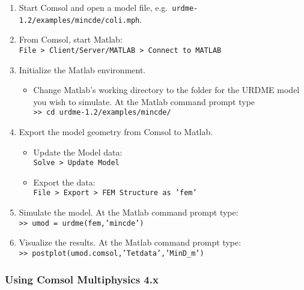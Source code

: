 \begin{enumerate}
\item Start Comsol and open a model file,
  e.g.~\texttt{urdme-1.2/examples/mincde/coli.mph}.
\item From Comsol, start Matlab: \\ \texttt{File >
  Client/Server/MATLAB > Connect to MATLAB}
\item Initialize the Matlab environment.
  \begin{itemize}
  \item Change Matlab's working directory to the folder for the URDME
    model you wish to simulate. At the Matlab command prompt type \\
    \texttt{>> cd urdme-1.2/examples/mincde/}
  \end{itemize}
\item Export the model geometry from Comsol to Matlab.
  \begin{itemize}
  \item Update the Model data:\\ \texttt{Solve >
    Update Model}
  \item Export the data:\\ \texttt{File > Export >
    FEM Structure as 'fem'}
  \end{itemize}
\item Simulate the model. At the Matlab command prompt
  type:\\ \texttt{>> umod = urdme(fem,'mincde')}
\item Visualize the results. At the Matlab command prompt
  type:\\ \texttt{>> postplot(umod.comsol,'Tetdata','MinD\_m')}
\end{enumerate}

\subsubsection{Using Comsol Multiphysics 4.x}

